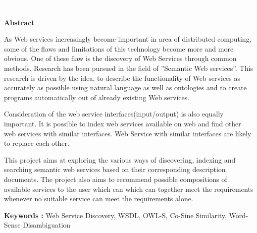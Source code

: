 \documentclass[12pt, oneside]{book}
\begin{document}
\pagebreak \textcolor{white}{text} \pagebreak
\thispagestyle{empty}
\begin{center}
	\textbf{ \huge Abstract}
\end{center}
\vspace{1cm}
As Web services increasingly become important in area of distributed computing, some of the flaws and limitations of this technology become more and more obvious. One of these flaw is the discovery of Web Services through common methods. Research has been pursued in the field of ”Semantic Web services”. This research is driven by the idea, to describe the functionality of Web services as accurately as possible using natural language as well as ontologies and to create programs automatically out of already existing Web services. \\ \par
Consideration of the web service interfaces(input/output) is also equally important. It is possible to index web services available on web and find other web services with similar interfaces. Web Service with similar interfaces are likely to replace each other. \\ \par
This project aims at exploring the various ways of discovering, indexing and searching semantic web services based on their corresponding description documents. The project also aims to recommend possible compositions of available services to the user which can which can together meet the requirements whenever no suitable service can meet the requirements alone.\\ \par
\textbf{Keywords : }Web Service Discovery, WSDL, OWL-S, Co-Sine Similarity, Word-Sense Disambiguation
\pagebreak
\thispagestyle{empty}
\pagebreak
\listoffigures
\listoftables
\tableofcontents

\pagebreak

\setcounter{page}{1}
\end{document}
